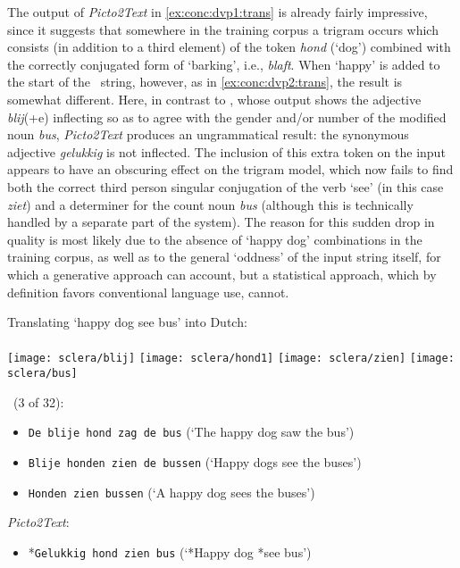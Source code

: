 The output of \emph{Picto2Text} in \cref{ex:conc:dvp1:trans} is already fairly
impressive, since it suggests that somewhere in the training corpus a trigram
occurs which consists (in addition to a third element) of the token \emph{hond}
(`dog') combined with the correctly conjugated form of `barking', i.e.,
\emph{blaft}. When `happy' is added to the start of the \sclera\ string,
however, as in \cref{ex:conc:dvp2:trans}, the result is somewhat different.
Here, in contrast to \depicto, whose output shows the adjective \emph{blij}(+e)
inflecting so as to agree with the gender and/or number of the modified noun
\emph{bus}, \emph{Picto2Text} produces an ungrammatical result: the synonymous
adjective \emph{gelukkig} is not inflected. The inclusion of this extra token
on the input appears to have an obscuring effect on the trigram model, which
now fails to find both the correct third person singular conjugation of the
verb `see' (in this case \emph{ziet}) and a determiner for the count noun
\emph{bus} (although this is technically handled by a separate part of the
system). The reason for this sudden drop in quality is most likely due to the
absence of `happy dog' combinations in the training corpus, as well as to the
general `oddness' of the input string itself, for which a generative approach
can account, but a statistical approach, which by definition favors
conventional language use, cannot.

\begin{exe}
    \ex \label{ex:conc:dvp2:trans} Translating `happy dog see bus' into Dutch: \\\\
     {\texttt{[image: sclera/blij]}\hspace{0.5cm}}
     {\texttt{[image: sclera/hond1]}\hspace{0.5cm}}
     {\texttt{[image: sclera/zien]}\hspace{0.5cm}}
     {\texttt{[image: sclera/bus]}\hspace{0.5cm}}
    \begin{xlist}
        \ex \depicto\ (3 of 32):
            \begin{itemize}
                \item \texttt{De blije hond zag de bus} (`The happy dog saw the bus')
                \item \texttt{Blije honden zien de bussen} (`Happy dogs see the buses')
                \item \texttt{Honden zien bussen} (`A happy dog sees the buses')
            \end{itemize}
        \ex \emph{Picto2Text}:
            \begin{itemize}
                \item *\texttt{Gelukkig hond zien bus} (`*Happy dog *see bus')
            \end{itemize}
    \end{xlist}
\end{exe}

